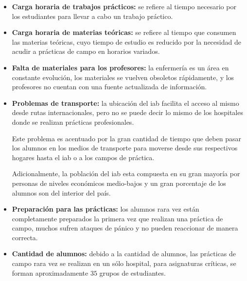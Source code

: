 \begin{itemize}

    \item \textbf{Carga horaria de trabajos prácticos:} se refiere al tiempo
        necesario por los estudiantes para llevar a cabo un trabajo
        práctico\cite{iab:tesis_alumnos}.
        
    \item \textbf{Carga horaria de materias teóricas:} se refiere al tiempo que
        consumen las materias teóricas, cuyo tiempo de estudio es reducido por
        la necesidad de acudir a prácticas de campo en horarios
        variados\cite{iab:tesis_alumnos}.
        

    \item \textbf{Falta de materiales para los profesores:} la enfermería es un
        área en constante evolución, los materiales se vuelven obsoletos
        rápidamente, y los profesores no cuentan con una fuente actualizada de
        información\cite{iab:tesis_alumnos}.
        
    \item \textbf{Problemas de transporte:} la ubicación del \Gls{iab} facilita
        el acceso al mismo desde rutas internacionales, pero no se puede decir
        lo mismo de los hospitales donde se realizan prácticas
        profesionales\cite{iab:tesis_alumnos}. 
        
        Este problema es acentuado por la gran cantidad de tiempo que deben
        pasar los alumnos en los medios de transporte para moverse desde sus
        respectivos hogares hasta el \Gls{iab} o a los campos de
        práctica\cite{iab:tesis_alumnos}.
        
        Adicionalmente, la población del \Gls{iab} esta compuesta en su gran
        mayoría por personas de niveles económicos medio-bajos y un gran
        porcentaje de los alumnos son del interior del
        país\cite{iab:tesis_alumnos}.
    
    \item \textbf{Preparación para las prácticas:} los alumnos rara vez están
        completamente preparados la primera vez que realizan una práctica de
        campo, muchos sufren ataques de pánico y no pueden reaccionar de manera
        correcta.
        
    \item \textbf{Cantidad de alumnos:} debido a la cantidad de alumnos, las
        prácticas de campo rara vez se realizan en un sólo hospital, para
        asignaturas críticas, se forman aproximadamente $35$ grupos de
        estudiantes.

\end{itemize}
